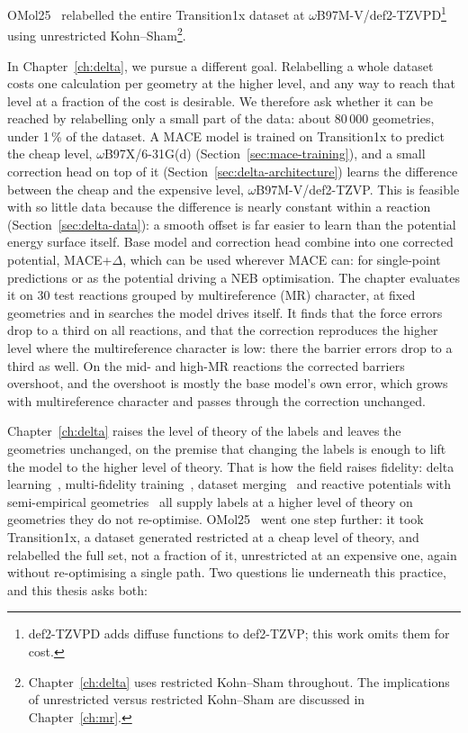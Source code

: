 OMol25~\cite{omol25} relabelled the entire Transition1x dataset at
\mbox{$\omega$B97M-V/def2-TZVPD}\footnote{def2-TZVPD adds diffuse
functions to def2-TZVP; this work omits them for cost.} using
unrestricted Kohn--Sham\footnote{Chapter~\ref{ch:delta} uses restricted
Kohn--Sham throughout. The implications of unrestricted versus
restricted Kohn--Sham are discussed in Chapter~\ref{ch:mr}.}.

In Chapter~\ref{ch:delta}, we pursue a different goal. Relabelling a
whole dataset costs one calculation per geometry at the higher level,
and any way to reach that level at a fraction of the cost is
desirable. We therefore ask whether it can be reached by relabelling
only a small part of the data: about 80\,000 geometries, under 1\,\%
of the dataset. A MACE model is trained on Transition1x to predict the cheap level,
\mbox{$\omega$B97X/6-31G(d)} (Section~\ref{sec:mace-training}), and
a small correction head on top of it
(Section~\ref{sec:delta-architecture}) learns the difference between
the cheap and the expensive level, \mbox{$\omega$B97M-V/def2-TZVP}. This is feasible with so little data because
the difference is nearly constant within a reaction
(Section~\ref{sec:delta-data}): a smooth offset is far easier to learn
than the potential energy surface itself. Base model and correction
head combine into one corrected potential, MACE+$\Delta$, which can be
used wherever MACE can: for single-point predictions or as the
potential driving a NEB optimisation. The chapter evaluates it on 30
test reactions grouped by multireference (MR) character, at
fixed geometries and in searches the model drives itself. It finds that the force errors drop to a third on all reactions, and
that the correction reproduces the higher level where the
multireference character is low: there the barrier errors drop to a
third as well. On the mid- and high-MR reactions the corrected
barriers overshoot, and the overshoot is mostly the base model's own
error, which grows with multireference character and passes through
the correction unchanged.


Chapter~\ref{ch:delta} raises the level of theory of the labels and
leaves the geometries unchanged, on the premise that changing the labels is
enough to lift the model to the higher level of theory. That is how the field raises fidelity: delta
learning~\cite{ramakrishnan2015}, multi-fidelity
training~\cite{messerly2025}, dataset merging~\cite{shiota2024} and
reactive potentials with semi-empirical geometries~\cite{ren2026} all
supply labels at a higher level of theory on geometries they do not
re-optimise. OMol25~\cite{omol25} went one step further: it took
Transition1x, a dataset generated restricted at a cheap level of
theory, and relabelled the full set, not a fraction of it,
unrestricted at an expensive one, again without re-optimising a single
path. Two questions lie underneath this
practice, and this thesis asks both:

